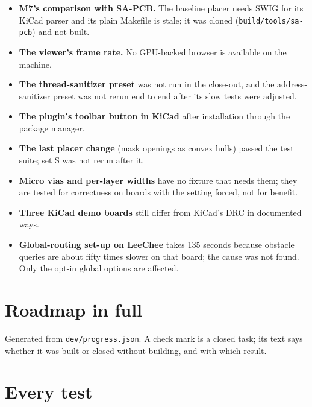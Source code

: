 \documentclass[10pt,a4paper]{article}
\newcommand{\code}[1]{\texttt{#1}}
\begin{document}
\begin{itemize}
\item \textbf{M7's comparison with SA-PCB.} The baseline placer needs SWIG for its KiCad parser and its plain
  Makefile is stale; it was cloned (\code{build/tools/sa-pcb}) and not built.
\item \textbf{The viewer's frame rate.} No GPU-backed browser is available on the machine.
\item \textbf{The thread-sanitizer preset} was not run in the close-out, and the address-sanitizer preset was not
  rerun end to end after its slow tests were adjusted.
\item \textbf{The plugin's toolbar button in KiCad} after installation through the package manager.
\item \textbf{The last placer change} (mask openings as convex hulls) passed the test suite; set S was not rerun
  after it.
\item \textbf{Micro vias and per-layer widths} have no fixture that needs them; they are tested for correctness
  on boards with the setting forced, not for benefit.
\item \textbf{Three KiCad demo boards} still differ from KiCad's DRC in documented ways.
\item \textbf{Global-routing set-up on LeeChee} takes 135 seconds because obstacle queries are about fifty times
  slower on that board; the cause was not found. Only the opt-in global options are affected.
\end{itemize}

\section{Roadmap in full}\label{sec:roadmapdetail}

Generated from \code{dev/progress.json}. A check mark is a closed task; its text says whether it was built or
closed without building, and with which result.



\appendix
\section{Every test}\label{sec:alltests}
\end{document}
